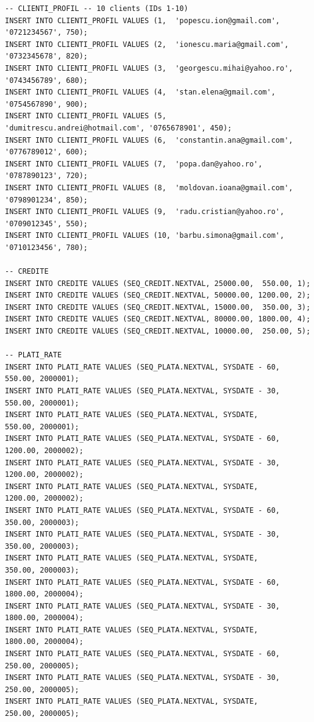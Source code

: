 \documentclass[12pt,a4paper]{article}
\begin{document}
\begin{lstlisting}
-- CLIENTI_PROFIL -- 10 clients (IDs 1-10)
INSERT INTO CLIENTI_PROFIL VALUES (1,  'popescu.ion@gmail.com',         '0721234567', 750);
INSERT INTO CLIENTI_PROFIL VALUES (2,  'ionescu.maria@gmail.com',       '0732345678', 820);
INSERT INTO CLIENTI_PROFIL VALUES (3,  'georgescu.mihai@yahoo.ro',      '0743456789', 680);
INSERT INTO CLIENTI_PROFIL VALUES (4,  'stan.elena@gmail.com',          '0754567890', 900);
INSERT INTO CLIENTI_PROFIL VALUES (5,  'dumitrescu.andrei@hotmail.com', '0765678901', 450);
INSERT INTO CLIENTI_PROFIL VALUES (6,  'constantin.ana@gmail.com',      '0776789012', 600);
INSERT INTO CLIENTI_PROFIL VALUES (7,  'popa.dan@yahoo.ro',             '0787890123', 720);
INSERT INTO CLIENTI_PROFIL VALUES (8,  'moldovan.ioana@gmail.com',      '0798901234', 850);
INSERT INTO CLIENTI_PROFIL VALUES (9,  'radu.cristian@yahoo.ro',        '0709012345', 550);
INSERT INTO CLIENTI_PROFIL VALUES (10, 'barbu.simona@gmail.com',        '0710123456', 780);

-- CREDITE
INSERT INTO CREDITE VALUES (SEQ_CREDIT.NEXTVAL, 25000.00,  550.00, 1);
INSERT INTO CREDITE VALUES (SEQ_CREDIT.NEXTVAL, 50000.00, 1200.00, 2);
INSERT INTO CREDITE VALUES (SEQ_CREDIT.NEXTVAL, 15000.00,  350.00, 3);
INSERT INTO CREDITE VALUES (SEQ_CREDIT.NEXTVAL, 80000.00, 1800.00, 4);
INSERT INTO CREDITE VALUES (SEQ_CREDIT.NEXTVAL, 10000.00,  250.00, 5);

-- PLATI_RATE
INSERT INTO PLATI_RATE VALUES (SEQ_PLATA.NEXTVAL, SYSDATE - 60,  550.00, 2000001);
INSERT INTO PLATI_RATE VALUES (SEQ_PLATA.NEXTVAL, SYSDATE - 30,  550.00, 2000001);
INSERT INTO PLATI_RATE VALUES (SEQ_PLATA.NEXTVAL, SYSDATE,        550.00, 2000001);
INSERT INTO PLATI_RATE VALUES (SEQ_PLATA.NEXTVAL, SYSDATE - 60, 1200.00, 2000002);
INSERT INTO PLATI_RATE VALUES (SEQ_PLATA.NEXTVAL, SYSDATE - 30, 1200.00, 2000002);
INSERT INTO PLATI_RATE VALUES (SEQ_PLATA.NEXTVAL, SYSDATE,      1200.00, 2000002);
INSERT INTO PLATI_RATE VALUES (SEQ_PLATA.NEXTVAL, SYSDATE - 60,  350.00, 2000003);
INSERT INTO PLATI_RATE VALUES (SEQ_PLATA.NEXTVAL, SYSDATE - 30,  350.00, 2000003);
INSERT INTO PLATI_RATE VALUES (SEQ_PLATA.NEXTVAL, SYSDATE,        350.00, 2000003);
INSERT INTO PLATI_RATE VALUES (SEQ_PLATA.NEXTVAL, SYSDATE - 60, 1800.00, 2000004);
INSERT INTO PLATI_RATE VALUES (SEQ_PLATA.NEXTVAL, SYSDATE - 30, 1800.00, 2000004);
INSERT INTO PLATI_RATE VALUES (SEQ_PLATA.NEXTVAL, SYSDATE,      1800.00, 2000004);
INSERT INTO PLATI_RATE VALUES (SEQ_PLATA.NEXTVAL, SYSDATE - 60,  250.00, 2000005);
INSERT INTO PLATI_RATE VALUES (SEQ_PLATA.NEXTVAL, SYSDATE - 30,  250.00, 2000005);
INSERT INTO PLATI_RATE VALUES (SEQ_PLATA.NEXTVAL, SYSDATE,        250.00, 2000005);


\end{lstlisting}
\end{document}
